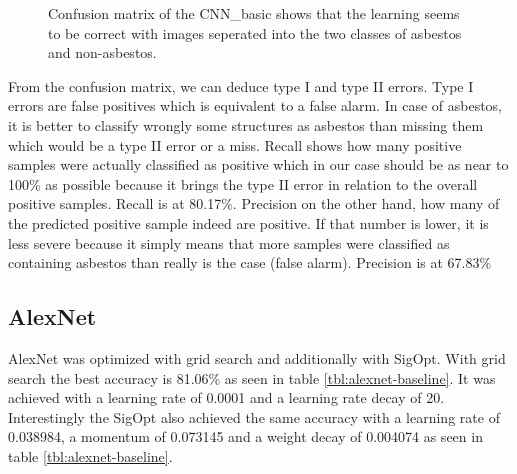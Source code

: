 \begin{figure}[h]
\centering
{}
\caption{Confusion matrix of the CNN\_basic shows that the learning seems to be correct with images seperated into the two classes of asbestos and non-asbestos.}
\label{fig:cnn-basic-cm}
\end{figure}


From the confusion matrix, we can deduce type I and type II errors. Type I errors are false positives which is equivalent to a false alarm. In case of asbestos, it is better to classify wrongly some structures as asbestos than missing them which would be a type II error or a miss. Recall shows how many positive samples were actually classified as positive which in our case should be as near to 100\% as possible because it brings the type II error in relation to the overall positive samples. Recall is at 80.17\%. Precision on the other hand, how many of the predicted positive sample indeed are positive. If that number is lower, it is less severe because it simply means that more samples were classified as containing asbestos than really is the case (false alarm). Precision is at 67.83\%














\subsection{AlexNet}

AlexNet was optimized with grid search and additionally with SigOpt. With grid search the best accuracy is 81.06\% as seen in table \ref{tbl:alexnet-baseline}. It was achieved with a learning rate of 0.0001 and a learning rate decay of 20. Interestingly the SigOpt also achieved the same accuracy with a learning rate of 0.038984, a momentum of 0.073145 and a weight decay of 0.004074 as seen in table \ref{tbl:alexnet-baseline}.


